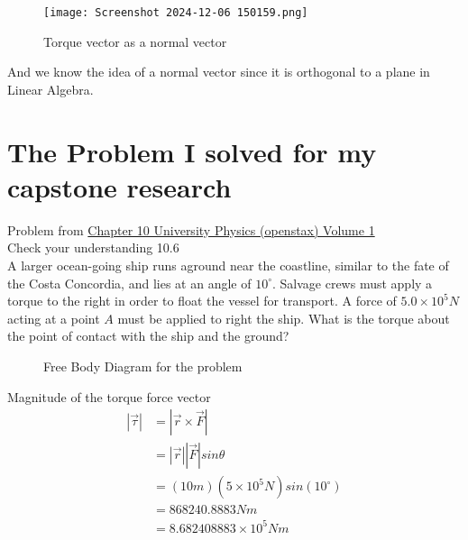 \documentclass{turabian-researchpaper}
\begin{document}
\begin{figure}[H] 
    \centering
    \texttt{[image: Screenshot 2024-12-06 150159.png]}
    \caption{Torque vector as a normal vector}
    \label{fig:torq-norm}
\end{figure} 

And we know the idea of a normal vector since it is orthogonal to a plane in Linear Algebra. 

\section{The Problem I solved for my capstone research} 

Problem from \href{https://openstax.org/books/university-physics-volume-1/pages/10-6-torque}{Chapter 10 University Physics (openstax) Volume 1} \\
\vspace{0.1cm} 
Check your understanding 10.6 \\
\vspace{0.1cm}
A larger ocean-going ship runs aground near the coastline, similar to the fate of the Costa Concordia, and lies at an angle of \(10^\circ\). Salvage crews must apply a torque to the right in order to float the vessel for transport. A force of \(5.0 \times 10^5 N\) acting at a point \(A\) must be applied to right the ship. What is the torque about the point of contact with the ship and the ground?  

\begin{figure}[H] 
    \centering
    \caption{Free Body Diagram for the problem}
    \label{fig:Problem-FBD} 
\end{figure}

Magnitude of the torque force vector 
\begin{align*}
    \left\lvert \overrightarrow{\tau} \right\rvert &= \left\lvert \overrightarrow{r} \times \overrightarrow{F} \right\rvert \\ 
                                                   &= \left\lvert \overrightarrow{r} \right\rvert \left\lvert \overrightarrow{F} \right\rvert sin\theta \\ 
                                                   &= (10m)(5 \times 10^5N)sin(10^\circ) \\  
                                                   &= 868240.8883 N m \\
                                                   &= 8.682408883 \times 10^5 Nm \\
\end{align*} 
\end{document}
